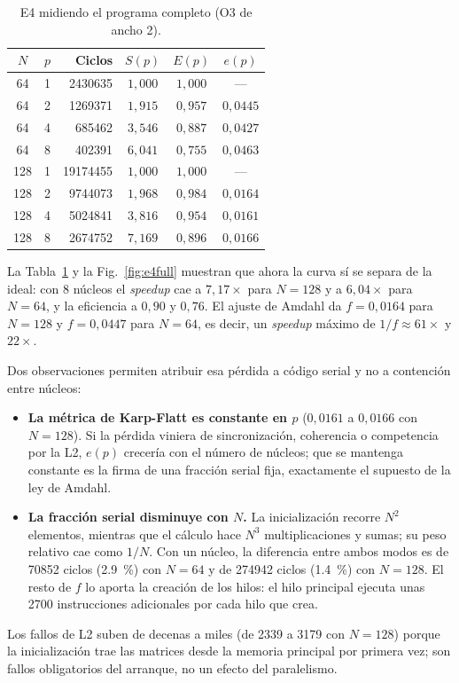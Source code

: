 \documentclass[journal]{IEEEtran}
\begin{document}
\begin{table}[h]
\centering
\caption{E4 midiendo el programa completo (O3 de ancho 2).}
\label{tab:e4full}
\footnotesize
\setlength{\tabcolsep}{3pt}
\begin{tabular}{|c|c|r|c|c|c|}
\hline
$N$ & $p$ & \textbf{Ciclos} & $S(p)$ & $E(p)$ & $e(p)$ \\ \hline
64  & 1 & \num{2430635}  & $1{,}000$ & $1{,}000$ & ---        \\ \hline
64  & 2 & \num{1269371}  & $1{,}915$ & $0{,}957$ & $0{,}0445$ \\ \hline
64  & 4 & \num{685462}   & $3{,}546$ & $0{,}887$ & $0{,}0427$ \\ \hline
64  & 8 & \num{402391}   & $6{,}041$ & $0{,}755$ & $0{,}0463$ \\ \hline
128 & 1 & \num{19174455} & $1{,}000$ & $1{,}000$ & ---        \\ \hline
128 & 2 & \num{9744073}  & $1{,}968$ & $0{,}984$ & $0{,}0164$ \\ \hline
128 & 4 & \num{5024841}  & $3{,}816$ & $0{,}954$ & $0{,}0161$ \\ \hline
128 & 8 & \num{2674752}  & $7{,}169$ & $0{,}896$ & $0{,}0166$ \\ \hline
\end{tabular}
\end{table}

La Tabla~\ref{tab:e4full} y la Fig.~\ref{fig:e4full} muestran que ahora
la curva sí se separa de la ideal: con 8 núcleos el \textit{speedup} cae
a $7{,}17\times$ para $N=128$ y a $6{,}04\times$ para $N=64$, y la
eficiencia a $0{,}90$ y $0{,}76$. El ajuste de Amdahl da
$f = 0{,}0164$ para $N=128$ y $f = 0{,}0447$ para $N=64$, es decir, un
\textit{speedup} máximo de $1/f \approx 61\times$ y $22\times$.

Dos observaciones permiten atribuir esa pérdida a código serial y no a
contención entre núcleos:
\begin{itemize}
  \item \textbf{La métrica de Karp-Flatt es constante en $p$}
        ($0{,}0161$ a $0{,}0166$ con $N=128$). Si la pérdida viniera de
        sincronización, coherencia o competencia por la L2, $e(p)$
        crecería con el número de núcleos; que se mantenga constante es
        la firma de una fracción serial fija, exactamente el supuesto de
        la ley de Amdahl.
  \item \textbf{La fracción serial disminuye con $N$.} La inicialización
        recorre $N^2$ elementos, mientras que el cálculo hace $N^3$
        multiplicaciones y sumas; su peso relativo cae como $1/N$. Con un
        núcleo, la diferencia entre ambos modos es de \num{70852} ciclos
        (\SI{2,9}{\percent}) con $N=64$ y de \num{274942} ciclos
        (\SI{1,4}{\percent}) con $N=128$. El resto de $f$ lo aporta la
        creación de los hilos: el hilo principal ejecuta unas
        \num{2700} instrucciones adicionales por cada hilo que crea.
\end{itemize}
Los fallos de L2 suben de decenas a miles (de \num{2339} a \num{3179}
con $N=128$) porque la inicialización trae las matrices desde la
memoria principal por primera vez; son fallos obligatorios del
arranque, no un efecto del paralelismo.
\end{document}
